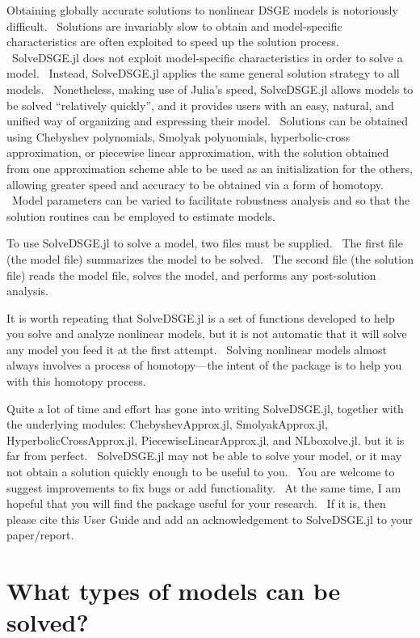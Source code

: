 \documentclass[notitlepage,11pt]{article}
\begin{document}
Obtaining globally accurate solutions to nonlinear DSGE models is
notoriously difficult. \ Solutions are invariably slow to obtain and
model-specific characteristics are often exploited to speed up the solution
process. \ SolveDSGE.jl does not exploit model-specific characteristics in
order to solve a model. \ Instead, SolveDSGE.jl applies the same general
solution strategy to all models. \ Nonetheless, making use of Julia's speed,
SolveDSGE.jl allows models to be solved \textquotedblleft relatively
quickly\textquotedblright , and it provides users with an easy, natural, and
unified way of organizing and expressing their model. \ Solutions can be
obtained using Chebyshev polynomials, Smolyak polynomials, hyperbolic-cross
approximation, or piecewise linear approximation, with the solution obtained
from one approximation scheme able to be used as an initialization for the
others, allowing greater speed and accuracy to be obtained via a form of
homotopy. \ Model parameters can be varied to facilitate robustness analysis
and so that the solution routines can be employed to estimate models.

To use SolveDSGE.jl to solve a model, two files must be supplied. \ The
first file (the model file) summarizes the model to be solved. \ The second
file (the solution file) reads the model file, solves the model, and
performs any post-solution analysis.

It is worth repeating that SolveDSGE.jl is a set of functions developed to
help you solve and analyze nonlinear models, but it is not automatic that it
will solve any model you feed it at the first attempt. \ Solving nonlinear
models almost always involves a process of homotopy---the intent of the
package is to help you with this homotopy process.

Quite a lot of time and effort has gone into writing SolveDSGE.jl, together
with the underlying modules: ChebyshevApprox.jl, SmolyakApprox.jl,
HyperbolicCrossApprox.jl, PiecewiseLinearApprox.jl, and NLboxolve.jl. but it
is far from perfect. \ SolveDSGE.jl may not be able to solve your model, or
it may not obtain a solution quickly enough to be useful to you. \ You are
welcome to suggest improvements to fix bugs or add functionality. \ At the
same time, I am hopeful that you will find the package useful for your
research. \ If it is, then please cite this User Guide and add an
acknowledgement to SolveDSGE.jl to your paper/report.

\section{What types of models can be solved?}
\end{document}
